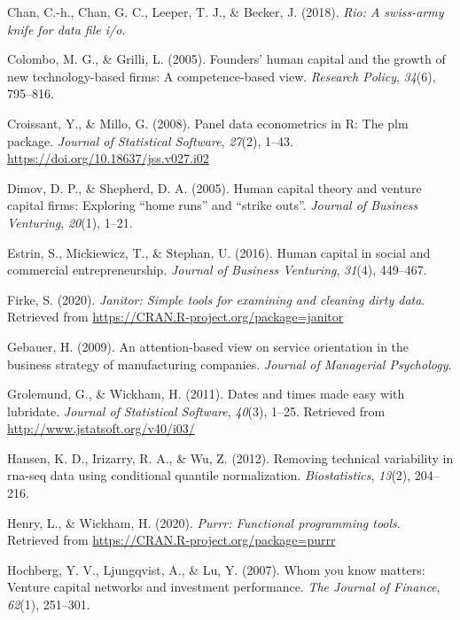 \documentclass[
  english,
  man]{apa6}
\begin{document}
\leavevmode\hypertarget{ref-R-rio}{}%
Chan, C.-h., Chan, G. C., Leeper, T. J., \& Becker, J. (2018). \emph{Rio: A swiss-army knife for data file i/o}.

\leavevmode\hypertarget{ref-colombo2005founders}{}%
Colombo, M. G., \& Grilli, L. (2005). Founders' human capital and the growth of new technology-based firms: A competence-based view. \emph{Research Policy}, \emph{34}(6), 795--816.

\leavevmode\hypertarget{ref-R-plm_a}{}%
Croissant, Y., \& Millo, G. (2008). Panel data econometrics in R: The plm package. \emph{Journal of Statistical Software}, \emph{27}(2), 1--43. \url{https://doi.org/10.18637/jss.v027.i02}

\leavevmode\hypertarget{ref-dimov2005human}{}%
Dimov, D. P., \& Shepherd, D. A. (2005). Human capital theory and venture capital firms: Exploring ``home runs'' and ``strike outs''. \emph{Journal of Business Venturing}, \emph{20}(1), 1--21.

\leavevmode\hypertarget{ref-estrin2016human}{}%
Estrin, S., Mickiewicz, T., \& Stephan, U. (2016). Human capital in social and commercial entrepreneurship. \emph{Journal of Business Venturing}, \emph{31}(4), 449--467.

\leavevmode\hypertarget{ref-R-janitor}{}%
Firke, S. (2020). \emph{Janitor: Simple tools for examining and cleaning dirty data}. Retrieved from \url{https://CRAN.R-project.org/package=janitor}

\leavevmode\hypertarget{ref-gebauer2009attention}{}%
Gebauer, H. (2009). An attention-based view on service orientation in the business strategy of manufacturing companies. \emph{Journal of Managerial Psychology}.

\leavevmode\hypertarget{ref-R-lubridate}{}%
Grolemund, G., \& Wickham, H. (2011). Dates and times made easy with lubridate. \emph{Journal of Statistical Software}, \emph{40}(3), 1--25. Retrieved from \url{http://www.jstatsoft.org/v40/i03/}

\leavevmode\hypertarget{ref-hansen2012removing}{}%
Hansen, K. D., Irizarry, R. A., \& Wu, Z. (2012). Removing technical variability in rna-seq data using conditional quantile normalization. \emph{Biostatistics}, \emph{13}(2), 204--216.

\leavevmode\hypertarget{ref-R-purrr}{}%
Henry, L., \& Wickham, H. (2020). \emph{Purrr: Functional programming tools}. Retrieved from \url{https://CRAN.R-project.org/package=purrr}

\leavevmode\hypertarget{ref-hochberg2007whom}{}%
Hochberg, Y. V., Ljungqvist, A., \& Lu, Y. (2007). Whom you know matters: Venture capital networks and investment performance. \emph{The Journal of Finance}, \emph{62}(1), 251--301.
\end{document}
